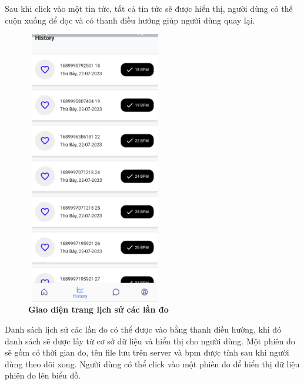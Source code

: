 Sau khi click vào một tin tức, tất cả tin tức sẽ được hiển thị, người dùng có thể cuộn xuống để đọc và có thanh điều hướng
giúp người dùng quay lại.

\begin{figure}[H]
  \centering
  \includegraphics[width=6cm,height=12cm]{Images/mobile_app/demo/history.png}
  \caption[Giao diện trang lịch sử các lần đo]{\bfseries \fontsize{12pt}{0pt}\selectfont Giao diện trang lịch sử các lần đo}
  \label{demo_history}
\end{figure}

Danh sách lịch sử các lần đo có thể được vào bằng thanh điều hướng, khi đó danh sách sẽ được lấy từ cơ sở dữ liệu và hiển thị cho người dùng.
Một phiên đo sẽ gồm có thời gian đo, tên file lưu trên server và bpm được tính sau khi người dùng theo dõi xong. Người dùng
có thể click vào một phiên đo để hiển thị dữ liệu phiên đo lên biểu đồ.

